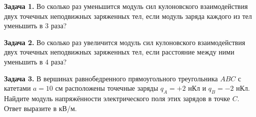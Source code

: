 
\begin{taskbasic}[code={\label{task:elem_coulomb_v1_n11}}]
\textbf{Задача 1.} Во сколько раз уменьшится модуль сил кулоновского взаимодействия двух точечных неподвижных заряженных тел, если модуль заряда каждого из тел уменьшить в $3$ раза?

\end{taskbasic}

\begin{taskbasic}[code={\label{task:elem_coulomb_v2_n11}}]
\textbf{Задача 2.} Во сколько раз увеличится модуль сил кулоновского взаимодействия двух точечных неподвижных заряженных тел, если расстояние между ними уменьшить в $4$ раза?

\end{taskbasic}

\begin{taskbasic}[code={\label{task:elem_coulomb_v3_n11}}]
\textbf{Задача 3.} В вершинах равнобедренного прямоугольного треугольника $ABC$ с катетами $a = 10\text{ см}$ расположены точечные заряды $q_A = +2\text{ нКл}$ и $q_B = -2\text{ нКл}$. Найдите модуль напряжённости электрического поля этих зарядов в точке $C$. Ответ выразите в кВ/м.

\nopagebreak\smallskip
\begin{center}
\end{center}

\end{taskbasic}

